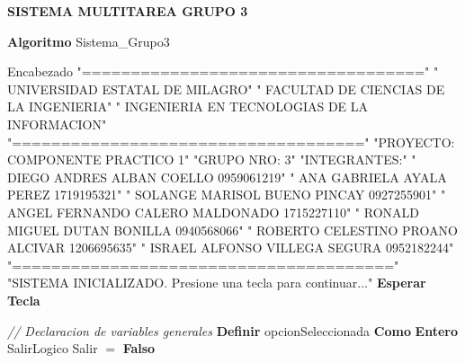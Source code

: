 \documentclass[12pt,a4paper]{article}
\newcommand{\kw}[1]{\textcolor{pseKeyword}{\textbf{#1}}}
\newcommand{\txt}[1]{\textcolor{pseString}{"#1"}}
\newcommand{\cmt}[1]{\textcolor{pseComment}{\textit{// #1}}}
\newcommand{\opAsig}{\textcolor{pseKeyword}{$=$}}
\newcommand{\Asignacion}[2]{#1\; \opAsig\; #2}
\newcommand{\Escribir}[1]{\kw{Escribir} #1}
\newcommand{\Definir}[2]{\kw{Definir} #1 \kw{Como} \kw{#2}}
\newcommand{\I}{\hspace{1.5em}}
\begin{document}
	\begin{center}
		{\LARGE\bfseries\textcolor{pseString}{SISTEMA MULTITAREA GRUPO 3}}
	\end{center}
	\vspace{0.5cm}
	\noindent
	\begin{algorithmic}[1]
		
		\State \kw{Algoritmo} Sistema\_Grupo3
		
		\State \I \kw \cmt{Encabezado}
		\State \I \kw \Escribir{\txt{===================================}}
		\State \I \kw \Escribir{\txt{           UNIVERSIDAD ESTATAL DE MILAGRO}}
		\State \I \kw \Escribir{\txt{        FACULTAD DE CIENCIAS DE LA INGENIERIA}}
		\State \I \kw \Escribir{\txt{    INGENIERIA EN TECNOLOGIAS DE LA INFORMACION}}
		\State \I \kw \Escribir{\txt{====================================}}
		\State \I \kw \Escribir{\txt{PROYECTO: COMPONENTE PRACTICO 1}}
		\State \I \kw \Escribir{\txt{GRUPO NRO: 3}}
		\State \I \kw \Escribir{\txt{INTEGRANTES:}}
		\State \I \kw \Escribir{\txt{  DIEGO ANDRES ALBAN COELLO        0959061219}}
		\State \I \kw \Escribir{\txt{  ANA GABRIELA AYALA PEREZ         1719195321}}
		\State \I \kw \Escribir{\txt{  SOLANGE MARISOL BUENO PINCAY     0927255901}}
		\State \I \kw \Escribir{\txt{  ANGEL FERNANDO CALERO MALDONADO  1715227110}}
		\State \I \kw \Escribir{\txt{  RONALD MIGUEL DUTAN BONILLA      0940568066}}
		\State \I \kw \Escribir{\txt{  ROBERTO CELESTINO PROANO ALCIVAR 1206695635}}
		\State \I \kw \Escribir{\txt{  ISRAEL ALFONSO VILLEGA SEGURA    0952182244}}
		\State \I \kw \Escribir{\txt{=======================================}}
		\State \I \kw \Escribir{\txt{SISTEMA INICIALIZADO. Presione una tecla para continuar...}}
		\State \I \kw{Esperar Tecla}
		\State
		
		\State \I \cmt{Declaracion de variables generales}
		\State \I \Definir{opcionSeleccionada}{Entero}
		\State \I \kw \Definir{Salir}{Logico}
		\State \I \Asignacion{Salir}{\kw{Falso}}
		

\end{algorithmic}
\end{document}
